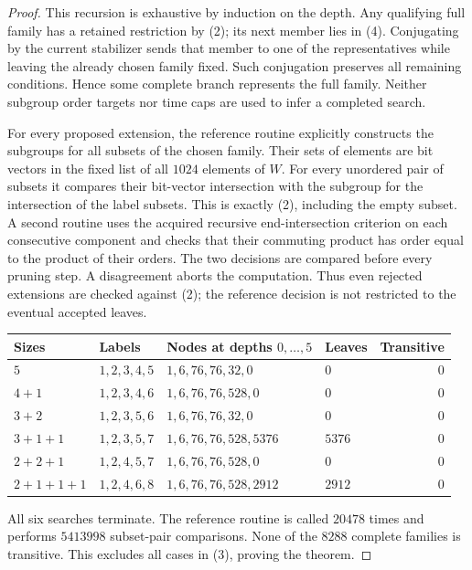 \documentclass[11pt,a4paper]{article}
\begin{document}
\begin{proof}
This recursion is exhaustive by induction on the depth. Any
qualifying full family has a retained restriction by (2); its
next member lies in (4). Conjugating by the current stabilizer
sends that member to one of the representatives while leaving
the already chosen family fixed. Such conjugation preserves all
remaining conditions. Hence some complete branch represents
the full family. Neither subgroup order targets nor time caps
are used to infer a completed search.

For every proposed extension, the reference routine explicitly
constructs the subgroups for all subsets of the chosen family.
Their sets of elements are bit vectors in the fixed list of all
$1024$ elements of $W$. For every unordered pair of subsets it
compares their bit-vector intersection with the subgroup for the
intersection of the label subsets. This is exactly (2), including
the empty subset. A second routine uses the acquired recursive
end-intersection criterion on each consecutive component and
checks that their commuting product has order equal to the product
of their orders. The two decisions are compared before every
pruning step. A disagreement aborts the computation. Thus even
rejected extensions are checked against (2); the reference decision
is not restricted to the eventual accepted leaves.

\begin{center}\small
\begin{tabular}{llllr}
\toprule
Sizes & Labels & Nodes at depths $0,\ldots,5$ & Leaves & Transitive\\
\midrule
$5$ & $1,2,3,4,5$ & $1,6,76,76,32,0$ & $0$ & $0$\\
$4+1$ & $1,2,3,4,6$ & $1,6,76,76,528,0$ & $0$ & $0$\\
$3+2$ & $1,2,3,5,6$ & $1,6,76,76,32,0$ & $0$ & $0$\\
$3+1+1$ & $1,2,3,5,7$ & $1,6,76,76,528,5376$ & $5376$ & $0$\\
$2+2+1$ & $1,2,4,5,7$ & $1,6,76,76,528,0$ & $0$ & $0$\\
$2+1+1+1$ & $1,2,4,6,8$ & $1,6,76,76,528,2912$ & $2912$ & $0$\\
\bottomrule
\end{tabular}
\end{center}

All six searches terminate. The reference routine is called
$20478$ times and performs $5413998$ subset-pair comparisons.
None of the $8288$ complete families is transitive. This excludes
all cases in (3), proving the theorem.
\end{proof}
\end{document}
